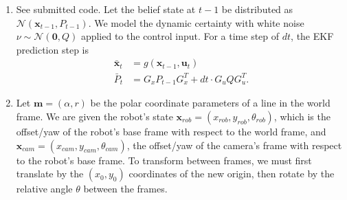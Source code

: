 \documentclass[12pt]{article}
\begin{document}
\begin{enumerate}
\begin{align*}
\begin{array}{cc}
		\sin(\theta_t) - \sin(\theta_{t-1}) & -\frac{V_t}{\omega_t}(\sin(\theta_t) - \sin(\theta_{t-1})) + V_t\cos(\theta_t)dt \\
		-\cos(\theta_t) + \cos(\theta_{t-1}) & \frac{V_t}{\omega_t}(\cos(\theta_t) - \cos(\theta_{t-1})) + V_t\sin(\theta_t)dt \\
		0 & \omega_tdt
		\end{array}\right).
	\end{align*}
	where $\theta_t := \theta_{t-1} + \omega_tdt$.
	\item See submitted code. Let the belief state at $t-1$ be distributed as $\mathcal{N}(\mathbf{x}_{t-1}, P_{t-1})$. We model the dynamic certainty with white noise $\nu \sim \mathcal{N}(\mathbf{0}, Q)$ applied to the control input. For a time step of $dt$, the EKF prediction step is
	\begin{align*}
		\bar{\mathbf{x}}_t &= g(\mathbf{x}_{t-1}, \mathbf{u}_t) \\
		\bar P_t &= G_xP_{t-1}G_x^T + dt \cdot G_uQG_u^T.
	\end{align*}
	\item Let $\mathbf{m} = (\alpha, r)$ be the polar coordinate parameters of a line in the world frame. We are given the robot's state $\mathbf{x}_{rob} = (x_{rob}, y_{rob}, \theta_{rob})$, which is the offset/yaw of the robot's base frame with respect to the world frame, and $\mathbf{x}_{cam} = (x_{cam}, y_{cam}, \theta_{cam})$, the offset/yaw of the camera's frame with respect to the robot's base frame. To transform between frames, we must first translate by the $(x_0,y_0)$ coordinates of the new origin, then rotate by the relative angle $\theta$ between the frames.
	

\end{enumerate}
\end{document}
